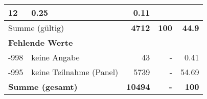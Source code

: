 \begin{longtable}{lXrrr}
       \num{12} &
       \num[round-mode=places,round-precision=2]{0,25} &
         \num[round-mode=places,round-precision=2]{0,11} \\
     \midrule
     \multicolumn{2}{l}{Summe (gültig)} &
       \textbf{\num{4712}} &
     \textbf{100} &
       \textbf{\num[round-mode=places,round-precision=2]{44,9}} \\
     \multicolumn{5}{l}{\textbf{Fehlende Werte}}\\
       -998 &
       keine Angabe &
         \num{43} &
        - &
         \num[round-mode=places,round-precision=2]{0,41} \\
       -995 &
       keine Teilnahme (Panel) &
         \num{5739} &
        - &
         \num[round-mode=places,round-precision=2]{54,69} \\
     \midrule
     \multicolumn{2}{l}{\textbf{Summe (gesamt)}} &
          \textbf{\num{10494}} &
        \textbf{-} &
        \textbf{100} \\
     \bottomrule
     \end{longtable}
     

